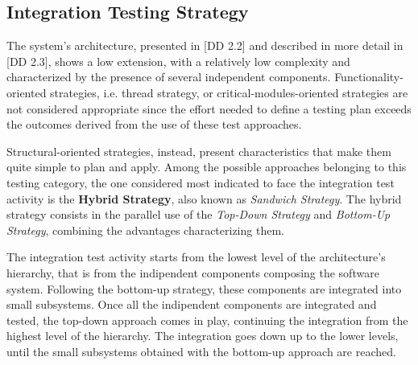 \subsection{Integration Testing Strategy}
\label{sec:integration-testing-strategy}

The system's architecture, presented in [DD 2.2] and described in more detail in [DD 2.3], shows a low extension, with a relatively low complexity and characterized by the presence of several independent components. Functionality-oriented strategies, i.e. thread strategy, or critical-modules-oriented strategies are not considered appropriate since the effort needed to define a testing plan exceeds the outcomes derived from the use of these test approaches.

Structural-oriented strategies, instead, present characteristics that make them quite simple to plan and apply. Among the possible approaches belonging to this testing category, the one considered most indicated to face the integration test activity is the \textbf{Hybrid Strategy}, also known as \textit{Sandwich Strategy}. The hybrid strategy consists in the parallel use of the \textit{Top-Down Strategy} and \textit{Bottom-Up Strategy}, combining the advantages characterizing them.

The integration test activity starts from the lowest level of the architecture's hierarchy, that is from the indipendent components composing the software system. Following the bottom-up strategy, these components are integrated into small subsystems. 
Once all the indipendent components are integrated and tested, the top-down approach comes in play, continuing the integration from the highest level of the hierarchy. The integration goes down up to the lower levels, until the small subsystems obtained with the bottom-up approach are reached.
